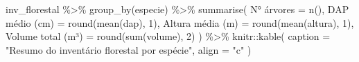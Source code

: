 \documentclass[
  letterpaper,
]{scrbook}
\newenvironment{Shaded}{\begin{snugshade}}{\end{snugshade}}
\newcommand{\AttributeTok}[1]{\textcolor[rgb]{0.40,0.45,0.13}{#1}}
\newcommand{\DecValTok}[1]{\textcolor[rgb]{0.68,0.00,0.00}{#1}}
\newcommand{\FunctionTok}[1]{\textcolor[rgb]{0.28,0.35,0.67}{#1}}
\newcommand{\NormalTok}[1]{\textcolor[rgb]{0.00,0.23,0.31}{#1}}
\newcommand{\OtherTok}[1]{\textcolor[rgb]{0.00,0.23,0.31}{#1}}
\newcommand{\SpecialCharTok}[1]{\textcolor[rgb]{0.37,0.37,0.37}{#1}}
\newcommand{\StringTok}[1]{\textcolor[rgb]{0.13,0.47,0.30}{#1}}
\begin{document}
\begin{Shaded}
\begin{Highlighting}[]
\NormalTok{inv\_florestal }\SpecialCharTok{\%\textgreater{}\%} 
  \FunctionTok{group\_by}\NormalTok{(especie) }\SpecialCharTok{\%\textgreater{}\%} 
  \FunctionTok{summarise}\NormalTok{(}
    \StringTok{\textasciigrave{}}\AttributeTok{N° árvores}\StringTok{\textasciigrave{}} \OtherTok{=} \FunctionTok{n}\NormalTok{(),}
    \StringTok{\textasciigrave{}}\AttributeTok{DAP médio (cm)}\StringTok{\textasciigrave{}} \OtherTok{=} \FunctionTok{round}\NormalTok{(}\FunctionTok{mean}\NormalTok{(dap), }\DecValTok{1}\NormalTok{),}
    \StringTok{\textasciigrave{}}\AttributeTok{Altura média (m)}\StringTok{\textasciigrave{}} \OtherTok{=} \FunctionTok{round}\NormalTok{(}\FunctionTok{mean}\NormalTok{(altura), }\DecValTok{1}\NormalTok{),}
    \StringTok{\textasciigrave{}}\AttributeTok{Volume total (m³)}\StringTok{\textasciigrave{}} \OtherTok{=} \FunctionTok{round}\NormalTok{(}\FunctionTok{sum}\NormalTok{(volume), }\DecValTok{2}\NormalTok{)}
\NormalTok{  ) }\SpecialCharTok{\%\textgreater{}\%} 
\NormalTok{  knitr}\SpecialCharTok{::}\FunctionTok{kable}\NormalTok{(}
    \AttributeTok{caption =} \StringTok{"Resumo do inventário florestal por espécie"}\NormalTok{,}
    \AttributeTok{align =} \StringTok{"c"}
\NormalTok{  )}
\end{Highlighting}
\end{Shaded}
\end{document}
